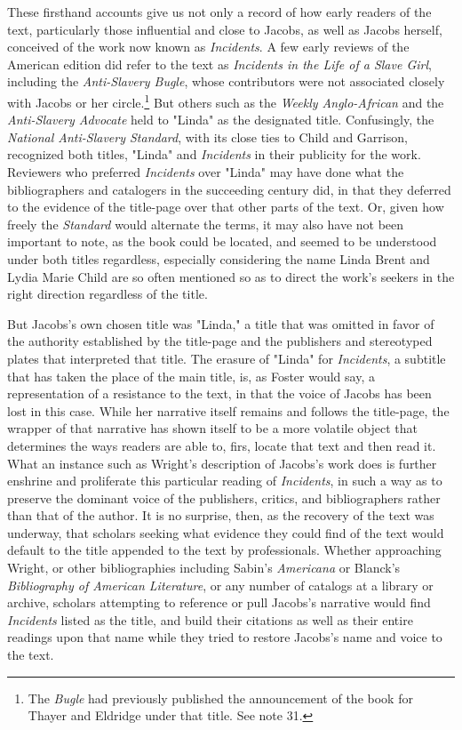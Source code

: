 These firsthand accounts give us not only a record of how early readers of the text, particularly those influential and close to Jacobs, as well as Jacobs herself, conceived of the work now known as \textit{Incidents}. A few early reviews of the American edition did refer to the text as \textit{Incidents in the Life of a Slave Girl}, including the \textit{Anti-Slavery Bugle}, whose contributors were not associated closely with Jacobs or her circle.\footnote{\autocite[327]{jacobs_harriet_2008-1} The \textit{Bugle} had previously published the announcement of the book for Thayer and Eldridge under that title. See note 31.} But others such as the \textit{Weekly Anglo-African} and the \textit{Anti-Slavery Advocate} held to "Linda" as the designated title.\autocite[349,351-2]{jacobs_harriet_2008-1} Confusingly, the \textit{National Anti-Slavery Standard}, with its close ties to Child and Garrison, recognized both titles, "Linda" and \textit{Incidents} in their publicity for the work.\autocite[328-35]{jacobs_harriet_2008-1} Reviewers who preferred \textit{Incidents} over "Linda" may have done what the bibliographers and catalogers in the succeeding century did, in that they deferred to the evidence of the title-page over that other parts of the text. Or, given how freely the \textit{Standard} would alternate the terms, it may also have not been important to note, as the book could be located, and seemed to be understood under both titles regardless, especially considering the name Linda Brent and Lydia Marie Child are so often mentioned so as to direct the work's seekers in the right direction regardless of the title. 

But Jacobs's own chosen title was "Linda," a title that was omitted in favor of the authority established by the title-page and the publishers and stereotyped plates that interpreted that title. The erasure of "Linda" for \textit{Incidents}, a subtitle that has taken the place of the main title, is, as Foster would say, a representation of a resistance to the text, in that the voice of Jacobs has been lost in this case. While her narrative itself remains and follows the title-page, the wrapper of that narrative has shown itself to be a more volatile object that determines the ways readers are able to, firs, locate that text and then read it. What an instance such as Wright's description of Jacobs's work does is further enshrine and proliferate this particular reading of \textit{Incidents}, in such a way as to preserve the dominant voice of the publishers, critics, and bibliographers rather than that of the author. It is no surprise, then, as the recovery of the text was underway, that scholars seeking what evidence they could find of the text would default to the title appended to the text by professionals. Whether approaching Wright, or other bibliographies including Sabin's \textit{Americana} or Blanck's \textit{Bibliography of American Literature}, or any number of catalogs at a library or archive, scholars attempting to reference or pull Jacobs's narrative would find \textit{Incidents} listed as the title, and build their citations as well as their entire readings upon that name while they tried to restore Jacobs's name and voice to the text.  


